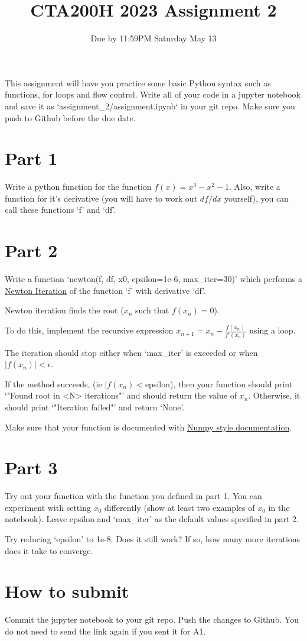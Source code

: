 \documentclass{article}
\title{CTA200H 2023 Assignment 2}
\author{Due by 11:59PM Saturday May 13}
\begin{document}
\maketitle

This assignment will have you practice some basic Python syntax such as functions, for loops and flow control. Write all of your code in a jupyter notebook and save it as `assignment\_2/assignment.ipynb` in your git repo. Make sure you push to Github before the due date.

\section*{Part 1}

Write a python function for the function $f(x) = x^3 - x^2 - 1$. Also, write a function for it's derivative (you will have to work out $df/dx$ yourself), you can call these functions `f' and `df'.

\section*{Part 2}

Write a function `newton(f, df, x0, epsilon=1e-6, max\_iter=30)' which performs a \href{https://en.wikipedia.org/wiki/Newton%27s_method}{Newton Iteration} of the function `f' with derivative `df'.

Newton iteration finds the root ($x_n$ such that $f(x_n) = 0$).

To do this, implement the recursive expression $x_{n+1} = x_n - \frac{f(x_n)}{f'(x_n)}$ using a loop.

The iteration should stop either when `max\_iter' is exceeded or when $|f(x_n)| < \epsilon$.

If the method succeeds, (ie $|f(x_n) < $epsilon), then your function should print `"Found root in <N> iterations"' and should return the value of $x_n$. Otherwise, it should print `"Iteration failed"' and return `None'.

Make sure that your function is documented with \href{https://numpydoc.readthedocs.io/en/latest/format.html}{Numpy style documentation}.

\section*{Part 3}

Try out your function with the function you defined in part 1. You can experiment with setting $x_0$ differently (show at least two examples of $x_0$ in the notebook). Leave epsilon and `max\_iter' as the default values specified in part 2.

Try reducing `epsilon' to 1e-8. Does it still work? If so, how many more iterations does it take to converge.

\section*{How to submit}

Commit the jupyter notebook to your git repo. Push the changes to Github. You do not need to send the link again if you sent it for A1.
\end{document}

